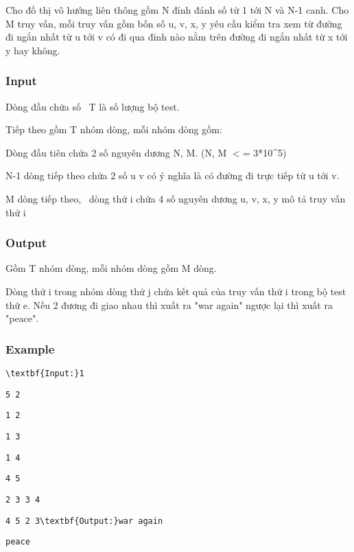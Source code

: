 

Cho đồ thị vô hướng liên thông gồm N đỉnh đánh số từ 1 tới N và N-1 canh. Cho M truy vấn, mỗi truy vấn gồm bốn số u, v, x, y yêu cầu kiểm tra xem từ đường đi ngắn nhất từ u tới v có đi qua đỉnh nào nằm trên đường đi ngắn nhất từ x tới y hay không.

\subsubsection{Input}

Dòng đầu chứa số  T là số lượng bộ test.

Tiếp theo gồm T nhóm dòng, mỗi nhóm dòng gồm:

Dòng đầu tiên chứa 2 số nguyên dương N, M. (N, M $<$= 3*10\textasciicircum5)

N-1 dòng tiếp theo chứa 2 số u v có ý nghĩa là có đường đi trực tiếp từ u tới v.

M dòng tiếp theo,  dòng thứ i chứa 4 số nguyên dương u, v, x, y mô tả truy vấn thứ i

\subsubsection{Output}

Gồm T nhóm dòng, mỗi nhóm dòng gồm M dòng.

Dòng thứ i trong nhóm dòng thứ j chứa kết quả của truy vấn thứ i trong bộ test thứ e. Nếu 2 đương đi giao nhau thì xuất ra "war again" ngược lại thì xuất ra "peace".

\subsubsection{Example}
\begin{verbatim}
\textbf{Input:}1\end{verbatim}
\begin{verbatim}
5 2\end{verbatim}
\begin{verbatim}
1 2\end{verbatim}
\begin{verbatim}
1 3\end{verbatim}
\begin{verbatim}
1 4\end{verbatim}
\begin{verbatim}
4 5\end{verbatim}
\begin{verbatim}
2 3 3 4\end{verbatim}
\begin{verbatim}
4 5 2 3\textbf{Output:}war again\end{verbatim}
\begin{verbatim}
peace\end{verbatim}